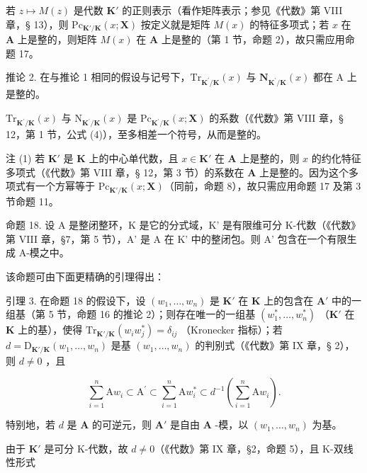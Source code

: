 若 \(z \mapsto M(z)\) 是代数 \(\mathbf{K}'\) 的正则表示（看作矩阵表示；参见《代数》第 VIII 章，§ 13），则 \(\mathrm{Pc}_{\mathbf{K}' / \mathbf{K}}(x; \mathbf{X})\) 按定义就是矩阵 \(M(x)\) 的特征多项式；若 \(x\) 在 \(\mathbf{A}\) 上是整的，则矩阵 \(M(x)\) 在 \(\mathbf{A}\) 上是整的（第 1 节，命题 2），故只需应用命题 17。

推论 2. 在与推论 1 相同的假设与记号下，\(\mathrm{Tr}_{\mathbf{K}^{\prime}/\mathbf{K}}(x)\) 与 \(\mathbf{N}_{\mathbf{K}^{\prime}/\mathbf{K}}(x)\) 都在 A 上是整的。

\(\mathrm{Tr}_{\mathbf{K}^{\prime}/\mathbf{K}}(x)\) 与 \(\mathrm{N}_{\mathbf{K}^{\prime}/\mathbf{K}}(x)\) 是 \(\mathrm{Pc}_{\mathbf{K}^{\prime}/\mathbf{K}}(x;\mathbf{X})\) 的系数（《代数》第 VIII 章，§ 12，第 1 节，公式 (4)），至多相差一个符号，从而是整的。

注 (1) 若 \(\mathbf{K}'\) 是 \(\mathbf{K}\) 上的中心单代数，且 \(x \in \mathbf{K}'\) 在 \(\mathbf{A}\) 上是整的，则 \(x\) 的约化特征多项式（《代数》第 VIII 章，§ 12，第 3 节）的系数在 \(\mathbf{A}\) 上是整的。因为这个多项式有一个方幂等于 \(\mathrm{Pc}_{\mathbf{K}' / \mathbf{K}}(x; \mathbf{X})\)（同前，命题 8），故只需应用命题 17 及第 3 节命题 11。

命题 18. 设 A 是整闭整环，K 是它的分式域，K' 是有限维可分 K-代数（《代数》第 VIII 章，§7，第 5 节），A' 是 A 在 K' 中的整闭包。则 A' 包含在一个有限生成 A-模之中。

该命题可由下面更精确的引理得出：

引理 3. 在命题 18 的假设下，设 \((w_{1},\ldots ,w_{n})\) 是 \(\mathbf{K}'\) 在 \(\mathbf{K}\) 上的包含在 \(\mathbf{A}'\) 中的一组基（第 5 节，命题 16 的推论 2）；则存在唯一的一组基 \((w_{1}^{*},\dots ,w_{n}^{*})\) （\(\mathbf{K}'\) 在 \(\mathbf{K}\) 上的基），使得 \(\mathrm{Tr}_{\mathbf{K}' / \mathbf{K}}(w_i w_j^*) = \delta_{ij}\) （Kronecker 指标）；若 \(d = \mathrm{D}_{\mathbf{K}' / \mathbf{K}}(w_1,\dots ,w_n)\) 是基 \((w_{1},\dots ,w_{n})\) 的判别式（《代数》第 IX 章，§ 2），则 \(d\neq 0\) ，且

\[
\sum_ {i = 1} ^ {n} \mathrm{A} w _ {i} \subset \mathrm{A} ^ {\prime} \subset \sum_ {i = 1} ^ {n} \mathrm{A} w _ {i} ^ {*} \subset d ^ {- 1} \left(\sum_ {i = 1} ^ {n} \mathrm{A} w _ {i}\right).\tag{2}
\]

特别地，若 \(d\) 是 \(\mathbf{A}\) 的可逆元，则 \(\mathbf{A}'\) 是自由 \(\mathbf{A}\) -模，以 \((w_1, \ldots, w_n)\) 为基。

由于 \(\mathbf{K}'\) 是可分 K-代数，故 \(d \neq 0\)（《代数》第 IX 章，§2，命题 5），且 K-双线性形式

